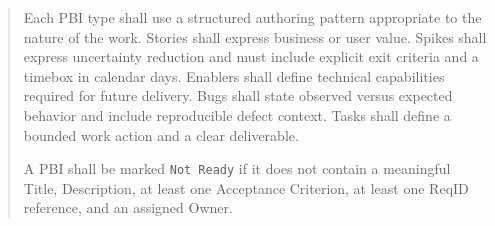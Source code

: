 \documentclass[11pt,a4paper]{article}
\begin{document}
\begin{quote}
Each PBI type shall use a structured authoring pattern appropriate to the nature of the work.  
Stories shall express business or user value.  
Spikes shall express uncertainty reduction and must include explicit exit criteria and a timebox in calendar days.  
Enablers shall define technical capabilities required for future delivery.  
Bugs shall state observed versus expected behavior and include reproducible defect context.  
Tasks shall define a bounded work action and a clear deliverable.

A PBI shall be marked \texttt{Not Ready} if it does not contain a meaningful Title, Description, at least one Acceptance Criterion, at least one ReqID reference, and an assigned Owner.
\end{quote}
\end{document}

